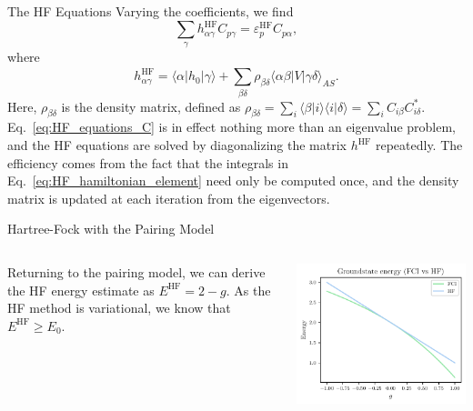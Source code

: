\documentclass[UKenglish,aspectratio=169]{beamer}
\begin{document}
\begin{frame}{The HF Equations}
    Varying the coefficients, we find
    \begin{equation}\label{eq:HF_equations_C}
        \sum_{\gamma} h_{\alpha\gamma}^{\mathrm{HF}} C_{p \gamma}
        = \varepsilon_p^{\mathrm{HF}} C_{p \alpha},
    \end{equation}
    where
    \begin{equation}\label{eq:HF_hamiltonian_element}
        h_{\alpha \gamma}^\mathrm{HF}
        = \langle \alpha \vert \hat{h}_0 \vert \gamma \rangle
        + \sum_{\beta\delta} \rho_{\beta\delta} \langle \alpha\beta \vert V \vert \gamma\delta \rangle_{AS}.
    \end{equation}
    Here, $\rho_{\beta\delta}$ is the density matrix, defined as
    $\rho_{\beta\delta} = \sum_{i} \langle \beta \vert i \rangle
    \langle i \vert \delta \rangle = \sum_{i} C_{i\beta} C_{i\delta}^*$.
    Eq.~\eqref{eq:HF_equations_C} is in effect nothing more than an
    eigenvalue problem, and the HF equations are solved by
    diagonalizing the matrix $h^\mathrm{HF}$ repeatedly.
    The efficiency comes from the fact that the integrals in
    Eq.~\eqref{eq:HF_hamiltonian_element} need only be computed once,
    and the density matrix is updated at each iteration from the eigenvectors.
\end{frame}

\begin{frame}{Hartree-Fock with the Pairing Model}
    \begin{columns}
        \begin{column}{.49\textwidth}
            Returning to the pairing model, we can derive the HF energy estimate as $E^{\mathrm{HF}} = 2 - g$.
            As the HF method is variational, we know that $E^{\mathrm{HF}} \geq E_0$.
        \end{column}

        \begin{column}{.49\textwidth}
            \includegraphics[width=\textwidth]{../midterm2/figures/e_groundstate_energy.pdf}
        \end{column}
    \end{columns}
\end{frame}
\end{document}
